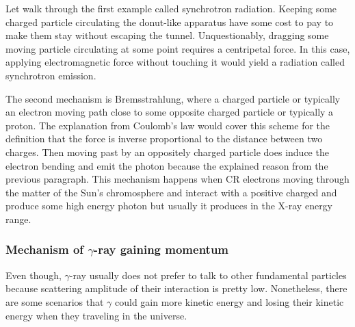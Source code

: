 \begin{itemize}
    Let walk through the first example called synchrotron radiation.
    Keeping some charged particle circulating the donut-like
    apparatus have some cost to pay to make them stay without
    escaping the tunnel. Unquestionably, dragging some moving
    particle circulating at some point requires a
    centripetal force. In this case, applying electromagnetic
    force without touching it would yield a radiation called
    synchrotron emission.

    The second mechanism is Bremsstrahlung, where a charged particle 
    or typically an electron moving path close to some opposite charged 
    particle or typically a proton. The explanation from Coulomb's law
    would cover this scheme for the definition that the force is 
    inverse proportional to the distance between two charges. Then 
    moving past by an oppositely charged particle does induce the electron
    bending and emit the photon because the explained reason from the 
    previous paragraph. This mechanism happens when CR electrons 
    moving through the matter of the Sun's chromosphere and interact with 
    a positive charged and produce some high energy photon but usually 
    it produces in the X-ray energy range.


\end{itemize}



\subsubsection{Mechanism of $\gamma$-ray gaining momentum}

Even though, $\gamma$-ray usually does not prefer
to talk to other fundamental particles because
scattering amplitude of their interaction is pretty 
low. Nonetheless, there are some scenarios that $\gamma$ could 
gain more kinetic energy and losing their kinetic energy 
when they traveling in the universe.

